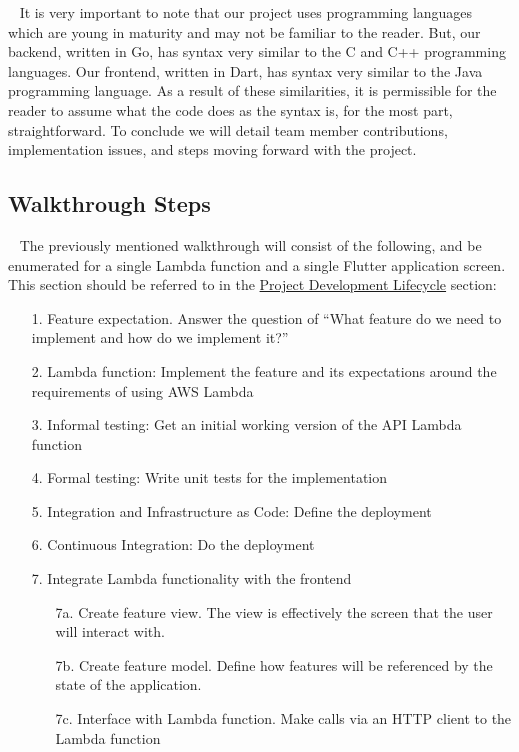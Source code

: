 \documentclass[10pt, a4paper]{article}
\begin{document}
\par ~ It is very important to note that our project uses programming languages which are young in maturity and may not be familiar to the reader. But, our backend, written in Go, has syntax very similar to the C and C++ programming languages. Our frontend, written in Dart, has syntax very similar to the Java programming language. As a result of these similarities, it is permissible for the reader to assume what the code does as the syntax is, for the most part, straightforward. To conclude we will detail team member contributions, implementation issues, and steps moving forward with the project.

\subsection{Walkthrough Steps}
\par ~ The previously mentioned walkthrough will consist of the following, and be enumerated for a single Lambda function and a single Flutter application screen. This section should be referred to in the \hyperref[sec:pdl]{Project Development Lifecycle} section:
\begin{enumerate}
	\item[1.] Feature expectation. Answer the question of ``What feature do we need to implement and how do we implement it?''
	\item[2.] Lambda function: Implement the feature and its expectations around the requirements of using AWS Lambda
	\item[3.] Informal testing: Get an initial working version of the API Lambda function
	\item[4.] Formal testing: Write unit tests for the implementation
	\item[5.] Integration and Infrastructure as Code: Define the deployment
	\item[6.] Continuous Integration: Do the deployment
	\item[7.] Integrate Lambda functionality with the frontend
	\begin{itemize}
		\item[7a.] Create feature view. The view is effectively the screen that the user will interact with.
		\item[7b.] Create feature model. Define how features will be referenced by the state of the application.
		\item[7c.] Interface with Lambda function. Make calls via an HTTP client to the Lambda function
	\end{itemize}
\end{enumerate}
\end{document}
